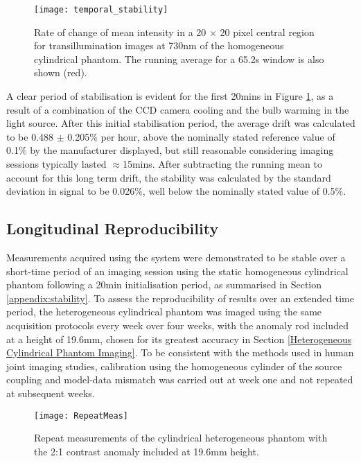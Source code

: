 \documentclass[twoside]{bhamthesis}
\theoremstyle{definition}
\begin{document}
\begin{figure}[!ht]
\centering
  \centering
  \texttt{[image: temporal\_stability]}
\caption{Rate of change of mean intensity in a 20 $\times$ 20 pixel central region for transillumination images at 730nm of the homogeneous cylindrical phantom. The running average for a 65.2s window is also shown (red).}
  \label{fig:Temporal_stability}
\end{figure}

A clear period of stabilisation is evident for the first 20mins in Figure \ref{fig:Temporal_stability}, as a result of a combination of the CCD camera cooling and the bulb warming in the light source. After this initial stabilisation period, the average drift was calculated to be 0.488 $\pm$ 0.205\% per hour, above the nominally stated reference value of 0.1\% by the manufacturer displayed, but still reasonable considering imaging sessions typically lasted $\approx$15mins. After subtracting the running mean to account for this long term drift, the stability was calculated by the standard deviation in signal to be 0.026\%, well below the nominally stated value of 0.5\%.

\subsection{Longitudinal Reproducibility}

\label{Reproducibility}

Measurements acquired using the system were demonstrated to be stable over a short-time period of an imaging session using the static homogeneous cylindrical phantom following a 20min initialisation period, as summarised in Section \ref{appendix:stability}. To assess the reproducibility of results over an extended time period, the heterogeneous cylindrical phantom was imaged using the same acquisition protocols every week over four weeks, with the anomaly rod included at a height of 19.6mm, chosen for its greatest accuracy in Section \ref{Heterogeneous Cylindrical Phantom Imaging}. To be consistent with the methods used in human joint imaging studies, calibration using the homogeneous cylinder of the source coupling and model-data mismatch was carried out at week one and not repeated at subsequent weeks.

\begin{figure}[!ht]
\texttt{[image: RepeatMeas]}
\centering
\caption{Repeat measurements of the cylindrical heterogeneous phantom with the 2:1 contrast anomaly included at 19.6mm height.}
\centering
\label{tab:Repeats}
\end{figure}
\end{document}
